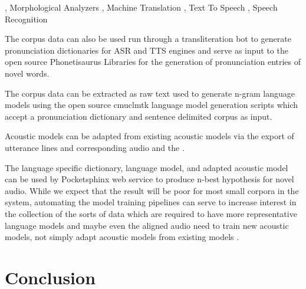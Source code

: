\documentclass[11pt]{article}
\begin{document}
	, Morphological Analyzers
	, Machine Translation
	, Text To Speech
	, Speech Recognition

The corpus data can also be used run through a transliteration bot to generate pronunciation dictionaries for ASR and TTS engines and serve as input  to  the open source Phonetisaurus Libraries \cite{Novak:2012} for the generation of pronunciation entries of novel words. 

The corpus data can be extracted as raw text used to generate n-gram language models using the open source cmuclmtk \cite{Clarkson:1997} language model generation scripts which accept a pronunciation dictionary and sentence delimited corpus as input. 

Acoustic models can be adapted from existing acoustic models via the export of utterance lines and corresponding audio and the  \cite{Elmahdy:2010}. 

The language specific dictionary, language model, and adapted acoustic model can be used by Pocketsphinx web service to produce n-best hypothesis for novel audio. While we expect that the result will be poor for most small corpora in the system, automating the model training pipelines can serve to increase interest in the collection of the sorts of data which are required to have more representative language models and maybe even the aligned audio need to train new acoustic models, not simply adapt acoustic models from existing models \cite{Sarfraz:2010}.


\section{Conclusion}
%


\printglossary




\end{document}
